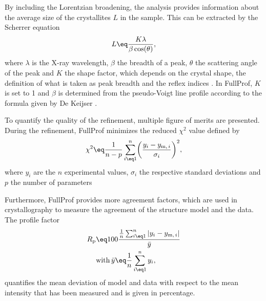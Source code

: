 \documentclass[\main/dresen_thesis.tex]{subfiles}
\begin{document}
    By including the Lorentzian broadening, the analysis provides information about the average size of the crystallites $L$ in the sample.
    This can be extracted by the Scherrer equation
    \begin{equation}
      L \eq \frac{K \lambda}{\beta \cos(\theta)},
    \end{equation}
    where $\lambda$ is the X-ray wavelength, $\beta$ the breadth of a peak, $\theta$ the scattering angle of the peak and $K$ the shape factor, which depends on the crystal shape, the definition of what is taken as peak breadth and the reflex indices \cite{Langford_1978_Scher}.
    In FullProf, $K$ is set to 1 and $\beta$ is determined from the pseudo-Voigt line profile according to the formula given by De Keijser \cite{DeKeijser_1982_Useof}.

    To quantify the quality of the refinement, multiple figure of merits are presented.
    During the refinement, FullProf minimizes the reduced $\chi^2$ value defined by
    \begin{align}
      \chi^2 \eq \frac{1}{n-p} \sum_{i \eq 1}^n \biggl(\frac{y_i - y_{\mathrm{m},\,i}}{\sigma_i}\biggr)^2,
    \end{align}
    where $y_i$ are the $n$ experimental values, $\sigma_i$ the respective standard deviations and $p$ the number of parameters

    Furthermore, FullProf provides more agreement factors, which are used in crystallography to measure the agreement of the structure model and the data.
    The profile factor
    \begin{align}
      \begin{split}
        R_\mathrm{p}
        &\eq 100\frac{\frac{1}{n}\sum_{i\eq1}^n |y_i - y_{\mathrm{m},\,i}|}{\bar{y}}\\
        &\mathrm{with\,} \bar{y} \eq \frac{1}{n}\sum_{i\eq1}^n y_i,
      \end{split}
    \end{align}
    quantifies the mean deviation of model and data with respect to the mean intensity that has been measured and is given in percentage.
\end{document}
